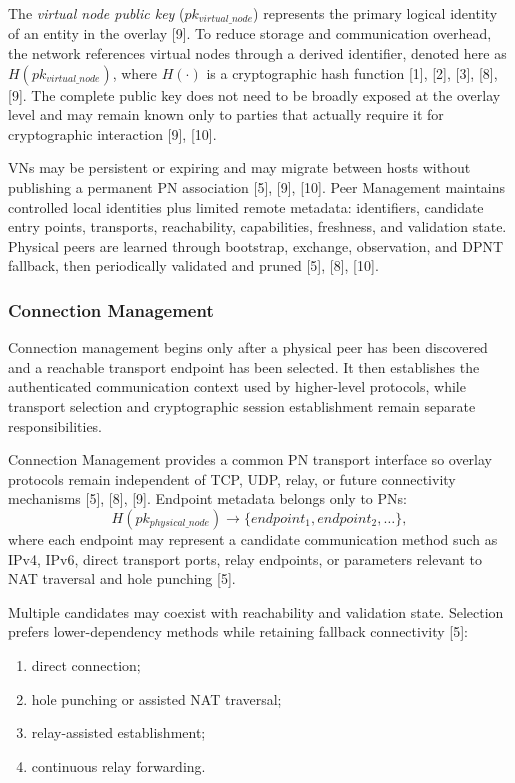 \documentclass[12pt,a4paper]{article}
\begin{document}
The \textit{virtual node public key} ($pk_{virtual\_node}$) represents the primary logical identity of an entity in the overlay [9]. To reduce storage and communication overhead, the network references virtual nodes through a derived identifier, denoted here as $H(pk_{virtual\_node})$, where $H(\cdot)$ is a cryptographic hash function [1], [2], [3], [8], [9]. The complete public key does not need to be broadly exposed at the overlay level and may remain known only to parties that actually require it for cryptographic interaction [9], [10].

VNs may be persistent or expiring and may migrate between hosts without publishing a permanent PN association [5], [9], [10]. Peer Management maintains controlled local identities plus limited remote metadata: identifiers, candidate entry points, transports, reachability, capabilities, freshness, and validation state. Physical peers are learned through bootstrap, exchange, observation, and DPNT fallback, then periodically validated and pruned [5], [8], [10].

\subsubsection{Connection Management}

Connection management begins only after a physical peer has been discovered and a reachable transport endpoint has been selected. It then establishes the authenticated communication context used by higher-level protocols, while transport selection and cryptographic session establishment remain separate responsibilities.

\thesisconnectiontikz

Connection Management provides a common PN transport interface so overlay protocols remain independent of TCP, UDP, relay, or future connectivity mechanisms [5], [8], [9]. Endpoint metadata belongs only to PNs:
\[
H(pk_{physical\_node}) \rightarrow \{endpoint_1, endpoint_2, \dots\},
\]
where each endpoint may represent a candidate communication method such as IPv4, IPv6, direct transport ports, relay endpoints, or parameters relevant to NAT traversal and hole punching [5].

Multiple candidates may coexist with reachability and validation state. Selection prefers lower-dependency methods while retaining fallback connectivity [5]:
\begin{enumerate}
    \item direct connection;
    \item hole punching or assisted NAT traversal;
    \item relay-assisted establishment;
    \item continuous relay forwarding.
\end{enumerate}
\end{document}

